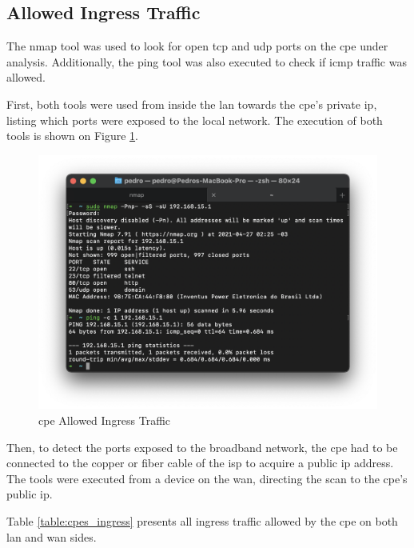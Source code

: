 \subsection{Allowed Ingress Traffic}

The nmap tool \cite{nmap} was used to look for open \gls{tcp} and \gls{udp} ports on the \gls{cpe} under analysis. Additionally, the ping tool \cite{ping} was also executed to check if \gls{icmp} traffic was allowed.

First, both tools were used from inside the \gls{lan} towards the \gls{cpe}’s private \gls{ip}, listing which ports were exposed to the local network. The execution of both tools is shown on Figure \ref{figure:cpe_allowed_ingress_traffic}.

\begin{figure}[h]
    \centering
    \includegraphics[width=\linewidth]{contents/cpes-and-research-data/allowed-ingress-traffic/cpe-allowed-ingress-traffic.png}
    \caption{\gls{cpe} Allowed Ingress Traffic}
    \label{figure:cpe_allowed_ingress_traffic}
\end{figure}

Then, to detect the ports exposed to the broadband network, the \gls{cpe} had to be connected to the copper or fiber cable of the \gls{isp} to acquire a public \gls{ip} address. The tools were executed from a device on the \gls{wan}, directing the scan to the \gls{cpe}’s public \gls{ip}.

Table \ref{table:cpes_ingress} presents all ingress traffic allowed by the \gls{cpe} on both \gls{lan} and \gls{wan} sides.

